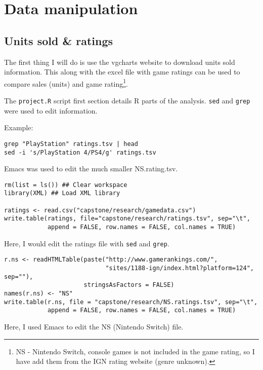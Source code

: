 \chapter{Data manipulation}
\section{Units sold \& ratings}
The first thing I will do is use the vgcharts website to download units sold information. This along with the excel file with game ratings can be used to compare sales (units) and game rating\footnote{NS - Nintendo Switch, console games is not included in the game rating, so I have add them from the IGN rating website (genre unknown).}.

The \texttt{project.R} script first section details R parts of the analysis. \texttt{sed} and \texttt{grep} were used to edit information.

Example:
\begin{verbatim}
grep "PlayStation" ratings.tsv | head
sed -i 's/PlayStation 4/PS4/g' ratings.tsv
\end{verbatim}

Emacs was used to edit the much smaller NS.rating.tsv.

\begin{verbatim}
rm(list = ls()) ## Clear workspace
library(XML) ## Load XML library

ratings <- read.csv("capstone/research/gamedata.csv")
write.table(ratings, file="capstone/research/ratings.tsv", sep="\t",
            append = FALSE, row.names = FALSE, col.names = TRUE)
\end{verbatim}
Here, I would edit the ratings file with \texttt{sed} and \texttt{grep}.

\begin{verbatim}
r.ns <- readHTMLTable(paste("http://www.gamerankings.com/",
                            "sites/1188-ign/index.html?platform=124", sep=""),
                      stringsAsFactors = FALSE)
names(r.ns) <- "NS"
write.table(r.ns, file = "capstone/research/NS.ratings.tsv", sep="\t",
            append = FALSE, row.names = FALSE, col.names = TRUE)
\end{verbatim}
Here, I used Emacs to edit the NS (Nintendo Switch) file.

